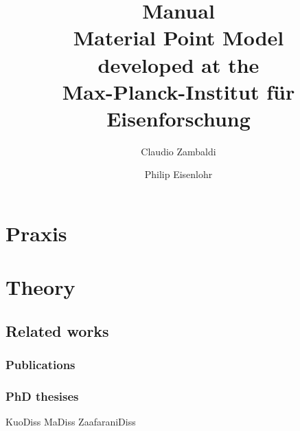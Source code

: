 \documentclass[USenglish]{scrbook}
\begin{document}
\title{Manual\\[1cm]Material Point Model \\[3mm] \normalsize developed at the \\[3mm] Max-Planck-Institut f\"ur Eisenforschung}
\author{Claudio Zambaldi \and Philip Eisenlohr}
\maketitle

%

\frontmatter
%
\tableofcontents
\listoftables
\listoffigures
%
\mainmatter

\renewcommand{\chaptermark}[1]{\markboth{{\thechapter\ \ #1}}{}}


\part{Praxis}
%

\part{Theory}







\appendix
\cleardoublepage {} %



\chapter{Related works}
\section{Publications}

\section{PhD thesises}
KuoDiss MaDiss ZaafaraniDiss



\end{document}
